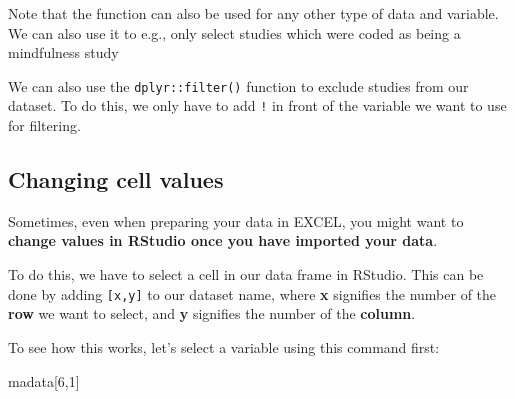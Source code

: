 \documentclass[]{book}
\newenvironment{Shaded}{\begin{snugshade}}{\end{snugshade}}
\newcommand{\KeywordTok}[1]{\textcolor[rgb]{0.13,0.29,0.53}{\textbf{#1}}}
\newcommand{\DataTypeTok}[1]{\textcolor[rgb]{0.13,0.29,0.53}{#1}}
\newcommand{\DecValTok}[1]{\textcolor[rgb]{0.00,0.00,0.81}{#1}}
\newcommand{\StringTok}[1]{\textcolor[rgb]{0.31,0.60,0.02}{#1}}
\newcommand{\OperatorTok}[1]{\textcolor[rgb]{0.81,0.36,0.00}{\textbf{#1}}}
\newcommand{\NormalTok}[1]{#1}
\theoremstyle{definition}
\theoremstyle{definition}
\theoremstyle{definition}
\theoremstyle{remark}
\begin{document}
Note that the function can also be used for any other type of data and
variable. We can also use it to e.g., only select studies which were
coded as being a mindfulness study

\begin{Shaded}
\end{Shaded}

We can also use the \texttt{dplyr::filter()} function to exclude studies
from our dataset. To do this, we only have to add \texttt{!} in front of
the variable we want to use for filtering.

\begin{Shaded}
\end{Shaded}

\subsection{Changing cell values}\label{changing-cell-values}

Sometimes, even when preparing your data in EXCEL, you might want to
\textbf{change values in RStudio once you have imported your data}.

To do this, we have to select a cell in our data frame in RStudio. This
can be done by adding \texttt{{[}x,y{]}} to our dataset name, where
\textbf{x} signifies the number of the \textbf{row} we want to select,
and \textbf{y} signifies the number of the \textbf{column}.

To see how this works, let's select a variable using this command first:

\begin{Shaded}
\begin{Highlighting}[]
\NormalTok{madata[}\DecValTok{6}\NormalTok{,}\DecValTok{1}\NormalTok{]}
\end{Highlighting}
\end{Shaded}
\end{document}
